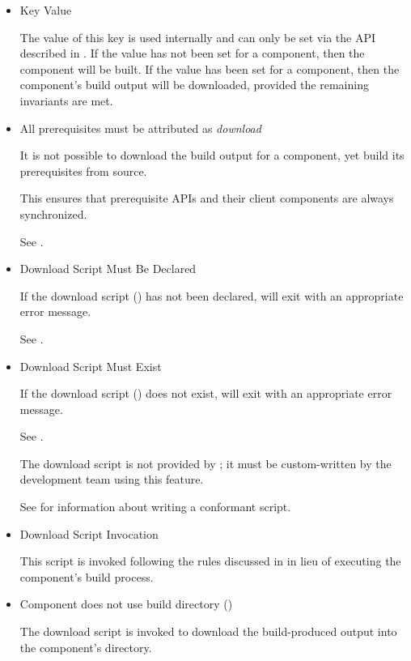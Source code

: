 \begin{itemize}
\item Key Value

  The value of this key is used internally and can only be set via the
  API described in .  If the value has
  not been set for a component, then the component will be built.  If
  the value has been set for a component, then the component's build
  output will be downloaded, provided the remaining invariants are
  met.

\item{All prerequisites must be attributed as \emph{download}}

  It is not possible to download the build output for a component, yet
  build its prerequisites from source.

  This ensures that prerequisite APIs and their client components are
  always synchronized.

  See .

\item{Download Script Must Be Declared}

  If the download script
  () has not
  been declared, \lmsbw will exit with an appropriate error
  message.

  See .

\item{Download Script Must Exist}

  If the download script
  () does not
  exist, \lmsbw will exit with an appropriate error message.

  See .

  The download script is not provided by \lmsbw; it must be
  custom-written by the development team using this feature.

  See  for information about
  writing a conformant script.

\item{Download Script Invocation}

  This script is invoked following the rules discussed in
   in lieu of executing the
  component's build process.

\item{Component does not use build directory ()}

  The download script is invoked to download the build-produced output
  into the component's \destdir directory.

\end{itemize}

